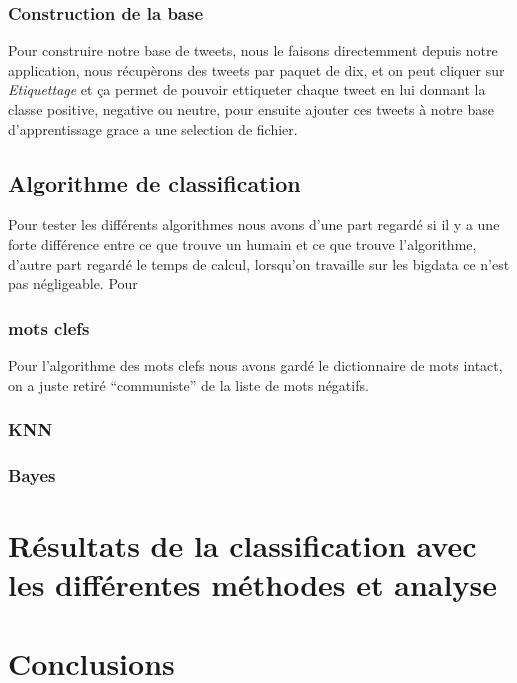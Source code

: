 \documentclass[a4paper,10pt]{report}
\begin{document}
    \subsection{Construction de la base}
      Pour construire notre base de tweets, nous le faisons directemment depuis notre application, nous récupèrons des tweets par 
      paquet de dix, et on peut cliquer sur \emph{Etiquettage} et ça permet de pouvoir ettiqueter chaque tweet en lui donnant la classe positive, negative ou neutre,
      pour ensuite ajouter ces tweets à notre base d'apprentissage grace a une selection de fichier.
  \section{Algorithme de classification}
    Pour tester les différents algorithmes nous avons d'une part regardé si il y a une forte différence entre ce que trouve un humain et ce que trouve l'algorithme, d'autre part
    regardé le temps de calcul, lorsqu'on travaille sur les bigdata ce n'est pas négligeable.
    Pour 
    \subsection{mots clefs}
      Pour l'algorithme des mots clefs nous avons gardé le dictionnaire de mots intact, on a juste retiré ``communiste'' de la liste de mots négatifs.
      
    \subsection{KNN}
    \subsection{Bayes}
\chapter{Résultats de la classification avec les différentes méthodes et analyse}
\chapter{Conclusions}
\end{document}
